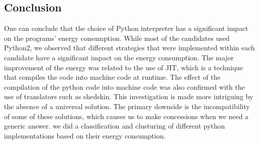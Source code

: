 \subsection{Conclusion}
One can conclude that the choice of Python interpreter has a significant impact on the programs' energy consumption.
While most of the candidates used Python2, we observed that different strategies that were implemented within each candidate have a significant impact on the energy consumption. 
The major improvement of the energy was related to the use of JIT, which is a technique that compiles the code into machine code at runtime. 
The effect of the compilation of the python code into machine code was also confirmed with the use of translators such as shedskin. 
This investigation is made more intriguing by the absence of a universal solution.
The primary downside is the incompatibility of some of these solutions, which causes us to make concessions when we need a generic answer.
we did a classification and clusturing of different python implementations based on their energy consumption.